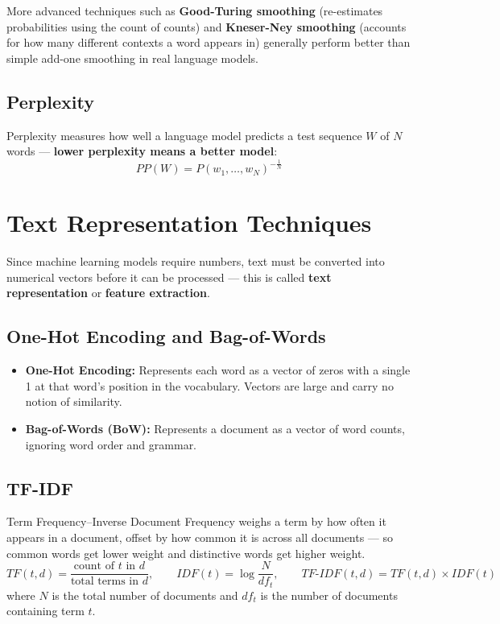 \documentclass[11pt,a4paper]{article}
\begin{document}
\begin{conceptbox}
More advanced techniques such as \textbf{Good-Turing smoothing} (re-estimates probabilities using the count of counts) and \textbf{Kneser-Ney smoothing} (accounts for how many different contexts a word appears in) generally perform better than simple add-one smoothing in real language models.
\end{conceptbox}

\subsection{Perplexity}
\begin{definitionbox}[Perplexity]
Perplexity measures how well a language model predicts a test sequence $W$ of $N$ words --- \textbf{lower perplexity means a better model}:
$$
PP(W) = P(w_1,\ldots,w_N)^{-\frac{1}{N}}
$$
\end{definitionbox}

\section{Text Representation Techniques}

\begin{definitionbox}
Since machine learning models require numbers, text must be converted into numerical vectors before it can be processed --- this is called \textbf{text representation} or \textbf{feature extraction}.
\end{definitionbox}

\subsection{One-Hot Encoding and Bag-of-Words}
\begin{itemize}[leftmargin=*]
  \item \textbf{One-Hot Encoding:} Represents each word as a vector of zeros with a single 1 at that word's position in the vocabulary. Vectors are large and carry no notion of similarity.
  \item \textbf{Bag-of-Words (BoW):} Represents a document as a vector of word counts, ignoring word order and grammar.
\end{itemize}

\subsection{TF-IDF}
\begin{definitionbox}[TF-IDF]
Term Frequency--Inverse Document Frequency weighs a term by how often it appears in a document, offset by how common it is across all documents --- so common words get lower weight and distinctive words get higher weight.
$$
TF(t,d) = \frac{\text{count of } t \text{ in } d}{\text{total terms in } d}, \qquad
IDF(t) = \log\frac{N}{df_t}, \qquad
TF\text{-}IDF(t,d) = TF(t,d)\times IDF(t)
$$
where $N$ is the total number of documents and $df_t$ is the number of documents containing term $t$.
\end{definitionbox}
\end{document}
